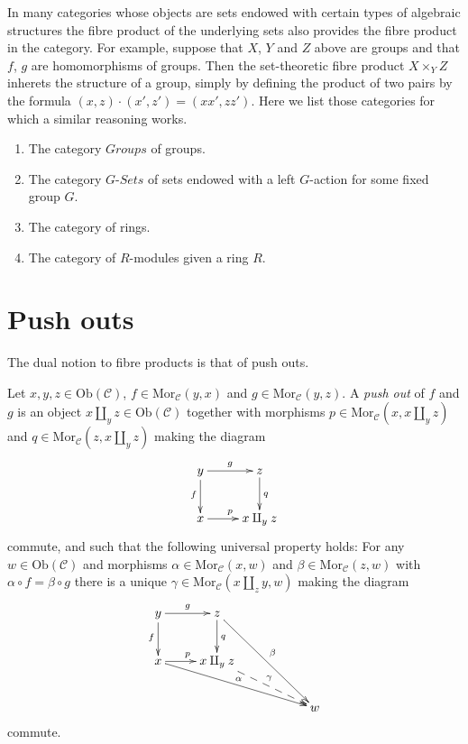 \medskip\noindent
In many categories whose objects are sets endowed with certain types of
algebraic structures the fibre product of the underlying sets also
provides the fibre product in the category. For example, suppose
that $X$, $Y$ and $Z$ above are groups and that $f$, $g$ are
homomorphisms of groups. Then the set-theoretic fibre product
$X\times_Y Z$ inherets the structure of a group, simply by
defining the product of two pairs by the formula
$(x,z) \cdot (x',z') = (xx', zz')$. Here we list those categories
for which a similar reasoning works.
\begin{enumerate}
\item The category $\textit{Groups}$ of groups.
\item The category $G\textit{-Sets}$ of sets
endowed with a left $G$-action for some fixed group $G$.
\item The category of rings.
\item The category of $R$-modules given a ring $R$.
\end{enumerate}

\section{Push outs}
\label{section-pushouts}

\noindent
The dual notion to fibre products is that of push outs.

\begin{definition}
\label{definition-pushouts}
Let $x,y,z\in \text{Ob}(\mathcal{C})$,
$f\in \text{Mor}_{\mathcal{C}}(y, x)$
and $g\in \text{Mor}_{\mathcal C}(y, z)$.
A {\it push out} of $f$ and $g$ is
an object $x\amalg_y z\in \text{Ob}(\mathcal{C})$
together with morphisms 
$p\in \text{Mor}_{\mathcal C}(x, x\amalg_y z)$ and 
$q\in\text{Mor}_{\mathcal C}(z, x\amalg_y z)$ making the diagram
$$
\xymatrix{
y \ar[r]^{g} \ar[d]_{f}
&
z \ar[d]^{q}
\\
x \ar[r]^{p}
&
x\amalg_y z
}
$$
commute, and such that the following universal property holds:
For any $w\in \text{Ob}(\mathcal{C})$ and morphisms 
$\alpha \in \text{Mor}_{\mathcal C}(x, w)$ and 
$\beta \in \text{Mor}_{\mathcal{C}}(z, w)$ with
$\alpha \circ f = \beta \circ g$ there is a unique
$\gamma\in \text{Mor}_{\mathcal C}(x\amalg_z y, w)$ making
the diagram
$$
\xymatrix{
y \ar[r]^{g} \ar[d]_{f}
&
z \ar[d]^{q} \ar[rrdd]^\beta
&
&
\\
x \ar[r]^{p} \ar[rrrd]^\alpha
&
x\amalg_y z  \ar@{-->}[rrd]^\gamma
&
&
\\
&&&
w
}
$$
commute.
\end{definition}

